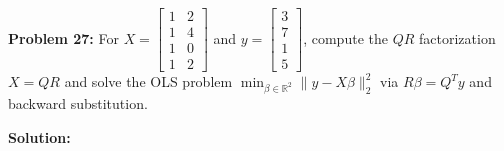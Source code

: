 \documentclass[11pt, letterpaper]{article}
\theoremstyle{definition}
\theoremstyle{remark}
\begin{document}
\vspace{0.8em}

\textbf{Problem 27:} For $X = \begin{bmatrix} 1 & 2 \\ 1 & 4 \\ 1 & 0 \\ 1 & 2 \end{bmatrix}$ and $y = \begin{bmatrix} 3 \\ 7 \\ 1 \\ 5 \end{bmatrix}$, compute the $QR$ factorization $X = QR$ and solve the OLS problem $\min_{\beta \in \mathbb{R}^2} \|y - X\beta\|_2^2$ via $R\beta = Q^T y$ and backward substitution.

\textbf{Solution:}
\end{document}
